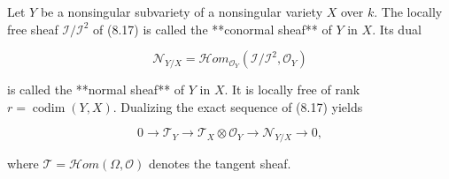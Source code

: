 Let $Y$ be a nonsingular subvariety of a nonsingular variety $X$ over $k$. The locally free sheaf $\mathcal{I}/\mathcal{I}^2$ of (8.17) is called the **conormal sheaf** of $Y$ in $X$. Its dual

$$\mathcal{N}_{Y/X} = \mathcal{H}om_{\mathcal{O}_Y}(\mathcal{I}/\mathcal{I}^2, \mathcal{O}_Y)$$

is called the **normal sheaf** of $Y$ in $X$. It is locally free of rank $r = \operatorname{codim}(Y, X)$. Dualizing the exact sequence of (8.17) yields

$$0 \to \mathcal{T}_Y \to \mathcal{T}_X \otimes \mathcal{O}_Y \to \mathcal{N}_{Y/X} \to 0,$$

where $\mathcal{T} = \mathcal{H}om(\Omega, \mathcal{O})$ denotes the tangent sheaf.
